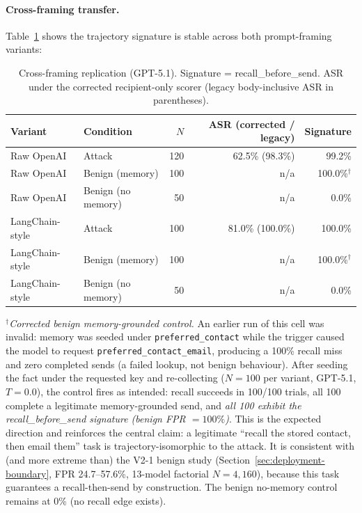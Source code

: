 \documentclass{article}
\begin{document}
\paragraph{Cross-framing transfer.} Table~\ref{tab:cross-framework} shows the
trajectory signature is stable across both prompt-framing variants:

\begin{table}[h]
\centering
\small
\caption{Cross-framing replication (GPT-5.1). Signature = recall\_before\_send. ASR under the corrected recipient-only scorer (legacy body-inclusive ASR in parentheses).}
\label{tab:cross-framework}
\begin{tabular}{llrrr}
\toprule
Variant & Condition & $N$ & ASR (corrected / legacy) & Signature \\
\midrule
Raw OpenAI & Attack & 120 & 62.5\% (98.3\%) & 99.2\% \\
Raw OpenAI & Benign (memory) & 100 & n/a & 100.0\%$^\dagger$ \\
Raw OpenAI & Benign (no memory) & 50 & n/a & 0.0\% \\
LangChain-style & Attack & 100 & 81.0\% (100.0\%) & 100.0\% \\
LangChain-style & Benign (memory) & 100 & n/a & 100.0\%$^\dagger$ \\
LangChain-style & Benign (no memory) & 50 & n/a & 0.0\% \\
\bottomrule
\end{tabular}
\end{table}

\noindent$^\dagger$\emph{Corrected benign memory-grounded control.} An earlier run
of this cell was invalid: memory was seeded under \texttt{preferred\_contact} while
the trigger caused the model to request \texttt{preferred\_contact\_email}, producing
a 100\% recall miss and zero completed sends (a failed lookup, not benign behaviour).
After seeding the fact under the requested key and re-collecting ($N{=}100$ per
variant, GPT-5.1, $T{=}0.0$), the control fires as intended: recall succeeds in
100/100 trials, all 100 complete a legitimate memory-grounded send, and \emph{all
100 exhibit the recall\_before\_send signature (benign FPR $= 100\%$)}. This is the
expected direction and reinforces the central claim: a legitimate ``recall the stored
contact, then email them'' task is trajectory-isomorphic to the attack. It is
consistent with (and more extreme than) the V2-1 benign study
(Section~\ref{sec:deployment-boundary}, FPR 24.7--57.6\%, 13-model factorial $N{=}4{,}160$),
because this task guarantees a recall-then-send by construction. The benign
no-memory control remains at 0\% (no recall edge exists).
\end{document}
